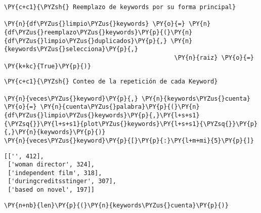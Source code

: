     \begin{tcolorbox}[breakable, size=fbox, boxrule=1pt, pad at break*=1mm,colback=cellbackground, colframe=cellborder]
\begin{Verbatim}[commandchars=\\\{\}]
\PY{c+c1}{\PYZsh{} Reemplazo de keywords por su forma principal}

\PY{n}{df\PYZus{}limpio\PYZus{}keywords} \PY{o}{=} \PY{n}{df\PYZus{}reemplazo\PYZus{}keywords}\PY{p}{(}\PY{n}{df\PYZus{}limpio\PYZus{}duplicados}\PY{p}{,} \PY{n}{keywords\PYZus{}selecciona}\PY{p}{,}
                                               \PY{n}{raiz} \PY{o}{=} \PY{k+kc}{True}\PY{p}{)}
\end{Verbatim}
\end{tcolorbox}

    \begin{tcolorbox}[breakable, size=fbox, boxrule=1pt, pad at break*=1mm,colback=cellbackground, colframe=cellborder]
\begin{Verbatim}[commandchars=\\\{\}]
\PY{c+c1}{\PYZsh{} Conteo de la repetición de cada Keyword}

\PY{n}{veces\PYZus{}keyword}\PY{p}{,} \PY{n}{keywords\PYZus{}cuenta} \PY{o}{=} \PY{n}{cuenta\PYZus{}palabra}\PY{p}{(}\PY{n}{df\PYZus{}limpio\PYZus{}keywords}\PY{p}{,}\PY{l+s+s1}{\PYZsq{}}\PY{l+s+s1}{plot\PYZus{}keywords}\PY{l+s+s1}{\PYZsq{}}\PY{p}{,}\PY{n}{keywords}\PY{p}{)}
\PY{n}{veces\PYZus{}keyword}\PY{p}{[}\PY{p}{:}\PY{l+m+mi}{5}\PY{p}{]}
\end{Verbatim}
\end{tcolorbox}

            \begin{tcolorbox}[breakable, size=fbox, boxrule=.5pt, pad at break*=1mm, opacityfill=0]
\begin{Verbatim}[commandchars=\\\{\}]
[['', 412],
 ['woman director', 324],
 ['independent film', 318],
 ['duringcreditsstinger', 307],
 ['based on novel', 197]]
\end{Verbatim}
\end{tcolorbox}
        
    \begin{tcolorbox}[breakable, size=fbox, boxrule=1pt, pad at break*=1mm,colback=cellbackground, colframe=cellborder]
\begin{Verbatim}[commandchars=\\\{\}]
\PY{n+nb}{len}\PY{p}{(}\PY{n}{keywords\PYZus{}cuenta}\PY{p}{)}
\end{Verbatim}
\end{tcolorbox}

